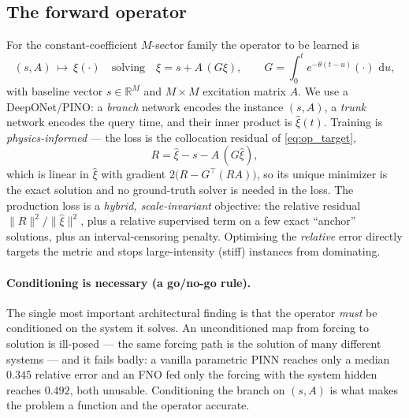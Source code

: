 \documentclass[11pt]{article}
\theoremstyle{plain}
\theoremstyle{definition}
\theoremstyle{remark}
\newcommand{\R}{\mathbb{R}}
\newcommand{\dd}{\,\mathrm{d}}
\begin{document}
\subsection{The forward operator}
For the constant-coefficient $M$-sector family the operator to be learned is
\begin{equation}
(s,A)\ \longmapsto\ \xi(\cdot)\quad\text{solving}\quad \xi=s+A\,(G\xi),\qquad G=\textstyle\int_0^t e^{-\theta(t-u)}(\cdot)\,\dd u,
\label{eq:op_target}
\end{equation}
with baseline vector $s\in\R^M$ and $M\times M$ excitation matrix $A$. We use a DeepONet/PINO: a \emph{branch} network encodes the instance $(s,A)$, a \emph{trunk} network encodes the query time, and their inner product is $\widehat\xi(t)$. Training is \emph{physics-informed} --- the loss is the collocation residual of \eqref{eq:op_target},
\begin{equation}
R=\widehat\xi-s-A\,(G\widehat\xi),
\label{eq:op_residual}
\end{equation}
which is linear in $\widehat\xi$ with gradient $2\big(R-G^\top(RA)\big)$, so its unique minimizer is the exact solution and no ground-truth solver is needed in the loss. The production loss is a \emph{hybrid, scale-invariant} objective: the relative residual $\|R\|^2/\|\widehat\xi\|^2$, plus a relative supervised term on a few exact ``anchor'' solutions, plus an interval-censoring penalty. Optimising the \emph{relative} error directly targets the metric and stops large-intensity (stiff) instances from dominating.

\paragraph{Conditioning is necessary (a go/no-go rule).}
The single most important architectural finding is that the operator \emph{must} be conditioned on the system it solves. An unconditioned map from forcing to solution is ill-posed --- the same forcing path is the solution of many different systems --- and it fails badly: a vanilla parametric PINN reaches only a median $0.345$ relative error and an FNO fed only the forcing with the system hidden reaches $0.492$, both unusable. Conditioning the branch on $(s,A)$ is what makes the problem a function and the operator accurate.
\end{document}

